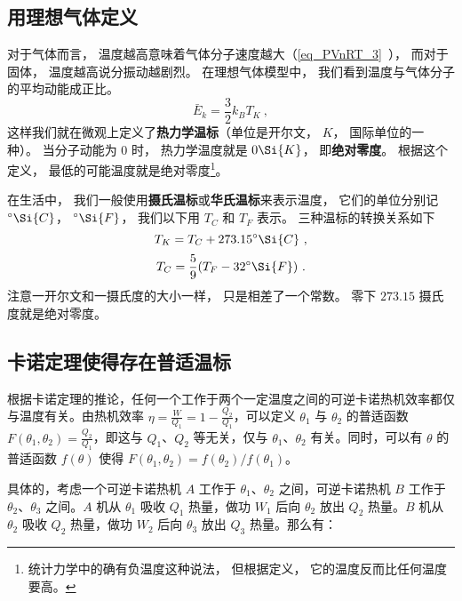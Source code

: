 

\subsection{用理想气体定义}
对于气体而言， 温度越高意味着气体分子速度越大（\autoref{eq_PVnRT_3}~）， 而对于固体， 温度越高说分振动越剧烈。 在理想气体模型中， 我们看到温度与气体分子的平均动能成正比。 
\begin{equation}
\bar E_k = \frac{3}{2} k_B T_K~,
\end{equation}
这样我们就在微观上定义了\textbf{热力学温标}（单位是开尔文， $K$， 国际单位的一种）。 当分子动能为 0 时， 热力学温度就是 $0 \Si{K}$， 即\textbf{绝对零度}。 根据这个定义， 最低的可能温度就是绝对零度\footnote{统计力学中的确有负温度这种说法， 但根据定义， 它的温度反而比任何温度要高。}。

在生活中， 我们一般使用\textbf{摄氏温标}或\textbf{华氏温标}来表示温度， 它们的单位分别记 $^\circ\Si{C}$， $^\circ\Si{F}$， 我们以下用 $T_C$ 和 $T_F$ 表示。 三种温标的转换关系如下
\begin{equation}
T_K = T_C + 273.15^\circ\Si{C}~,
\end{equation}
\begin{equation}
T_C = \frac{5}{9}(T_F - 32^\circ\Si{F})~.
\end{equation}
注意一开尔文和一摄氏度的大小一样， 只是相差了一个常数。 零下 $273.15$ 摄氏度就是绝对零度。

\subsection{卡诺定理使得存在普适温标}
根据卡诺定理的推论，任何一个工作于两个一定温度之间的可逆卡诺热机效率都仅与温度有关。由热机效率 $\eta = \frac{W}{Q_1}=1-\frac{Q_2}{Q_1}$，可以定义 $\theta_1$ 与 $\theta_2$ 的普适函数 $F(\theta_1, \theta_2) = \frac{Q_2}{Q_1}$，即这与 $Q_1$、$Q_2$ 等无关，仅与 $\theta_1$、$\theta_2$ 有关。同时，可以有 $\theta$ 的普适函数 $f(\theta)$ 使得 $F(\theta_1, \theta_2) = f(\theta_2)/f(\theta_1)$。

具体的，考虑一个可逆卡诺热机 $A$ 工作于 $\theta_1$、$\theta_2$ 之间，可逆卡诺热机 $B$ 工作于 $\theta_2$、$\theta_3$ 之间。$A$ 机从 $\theta_1$ 吸收 $Q_1$ 热量，做功 $W_1$ 后向 $\theta_2$ 放出 $Q_2$ 热量。$B$ 机从 $\theta_2$ 吸收 $Q_2$ 热量，做功 $W_2$ 后向 $\theta_3$ 放出 $Q_3$ 热量。那么有：

